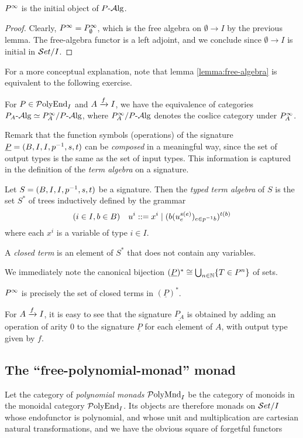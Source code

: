 \begin{corollary}
  $P^\moo$ is the initial object of $P\alg$.
\end{corollary}
\begin{proof}
  Clearly, $P^\moo=P_\emptyset^\moo$, which is the free algebra on $\emptyset\to
  I$ by the previous lemma. The free-algebra functor is a left adjoint, and we
  conclude since $\emptyset\to I$ is initial in $\Set/I$.
\end{proof}


For a more conceptual explanation, note that lemma \ref{lemma:free-algebra} is
equivalent to the following exercise.
\begin{exercise}
  For $P\in\PolyEnd_I$ and $A\xto{f} I$, we have the equivalence of categories
  $P_A\alg\simeq P_A^\moo/P\alg$, where $P_A^\moo/P\alg$ denotes the coslice
  category under $P_A^\moo$.
\end{exercise}


Remark that the function symbols (operations) of the signature $\underline{P} =
(B,I,I,p\inv,s,t)$ can be \emph{composed} in a meaningful way, since the set of
output types is the same as the set of input types. This information is captured
in the definition of the \emph{term algebra} on a signature.
\begin{definition}
  Let $S=(B,I,I,p\inv,s,t)$ be a signature. Then the \emph{typed term algebra}
  of $S$ is the set $S^*$ of trees inductively defined by the grammar
  \[
    (i\in I,b\in B)\quad u^i ::= x^i \ssep (b(u_e^{s(e)})_{e\in p\inv b})^{t(b)}
  \]
  where each $x^i$ is a variable of type $i\in I$.

  A \emph{closed term} is an element of $S^*$ that does not contain any
  variables.
\end{definition}

\begin{remark}
  We immediately note the canonical bijection $(\underline{P})^* \cong
  \bigcup_{n\in\NN} \{ T\in P^n \}$ of sets.
\end{remark}

\begin{remark}
  $P^\moo$ is precisely the set of closed terms in $(\underline{P})^*$.
\end{remark}

For $A \xto{f} I$, it is easy to see that the signature $\underline{P_A}$ is
obtained by adding an operation of arity $0$ to the signature $\underline{P}$
for each element of $A$, with output type given by $f$.

\subsection{The ``free-polynomial-monad'' monad}
Let the category of \emph{polynomial monads} $\PolyMnd_I$ be the category of
monoids in the monoidal category $\PolyEnd_I$. Its objects are therefore monads
on $\Set/I$ whose endofunctor is polynomial, and whose unit and multiplication
are cartesian natural transformations, and we have the obvious square of
forgetful functors

